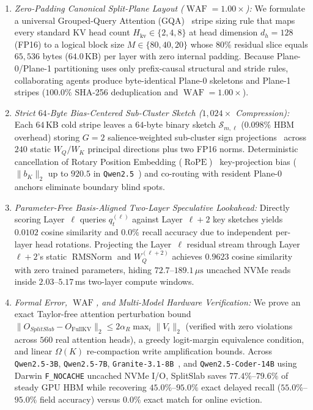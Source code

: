 \documentclass[10pt,journal,compsoc]{IEEEtran}
\theoremstyle{definition}
\theoremstyle{remark}
\newcommand{\SplitSlab}{\textup{\textsc{SplitSlab}}}
\newcommand{\RMSNorm}{\operatorname{RMSNorm}}
\newcommand{\RoPE}{\operatorname{RoPE}}
\newcommand{\WAF}{\operatorname{WAF}}
\def\SplitSlab{SplitSlab}%
\begin{document}
\begin{enumerate}
  \item \emph{Zero-Padding Canonical Split-Plane Layout ($\WAF = 1.00\times$):} We formulate a universal Grouped-Query Attention (GQA)~\cite{ainslie2023gqa} stripe sizing rule that maps every standard KV head count $H_{\mathrm{kv}} \in \{2, 4, 8\}$ at head dimension $d_h = 128$ (FP16) to a logical block size $M \in \{80, 40, 20\}$ whose $80\%$ residual slice equals $65{,}536$ bytes ($64.0$\,KB) per layer with zero internal padding. Because Plane-0/Plane-1 partitioning uses only prefix-causal structural and stride rules, collaborating agents produce byte-identical Plane-0 skeletons and Plane-1 stripes ($100.0\%$ SHA-256 deduplication and $\WAF = 1.00\times$).
  \item \emph{Strict $64$-Byte Bias-Centered Sub-Cluster Sketch ($1{,}024\times$ Compression):} Each $64$\,KB cold stripe leaves a $64$-byte binary sketch $\mathcal{S}_{m,\ell}$ ($0.098\%$ HBM overhead) storing $G=2$ salience-weighted sub-cluster sign projections~\cite{charikar2002simhash,gao2024rabitq} across $240$ static $W_Q/W_K$ principal directions plus two FP16 norms. Deterministic cancellation of Rotary Position Embedding ($\RoPE$)~\cite{su2024roformer} key-projection bias ($\|b_K\|_2$ up to $920.5$ in \texttt{Qwen2.5}~\cite{yang2024qwen25}) and co-routing with resident Plane-0 anchors eliminate boundary blind spots.
  \item \emph{Parameter-Free Basis-Aligned Two-Layer Speculative Lookahead:} Directly scoring Layer~$\ell$ queries $q_t^{(\ell)}$ against Layer~$\ell+2$ key sketches yields $0.0102$ cosine similarity and $0.0\%$ recall accuracy due to independent per-layer head rotations. Projecting the Layer~$\ell$ residual stream through Layer~$\ell+2$'s static $\RMSNorm$ and $W_Q^{(\ell+2)}$ achieves $0.9623$ cosine similarity with zero trained parameters, hiding $72.7$--$189.1\,\mu\mathrm{s}$ uncached NVMe reads inside $2.03$--$5.17$\,ms two-layer compute windows.
  \item \emph{Formal Error, $\WAF$, and Multi-Model Hardware Verification:} We prove an exact Taylor-free attention perturbation bound $\|O_{\SplitSlab} - O_{\mathrm{FullKV}}\|_2 \le 2\alpha_R \max_i\|V_i\|_2$ (verified with zero violations across $560$ real attention heads), a greedy logit-margin equivalence condition, and linear $\Omega(K)$ re-compaction write amplification bounds. Across \texttt{Qwen2.5-3B}, \texttt{Qwen2.5-7B}, \texttt{Granite-3.1-8B}~\cite{mishra2024granite}, and \texttt{Qwen2.5-Coder-14B} using Darwin \texttt{F\_NOCACHE} uncached NVMe I/O, \SplitSlab{} saves $77.4\%$--$79.6\%$ of steady GPU HBM while recovering $45.0\%$--$95.0\%$ exact delayed recall ($55.0\%$--$95.0\%$ field accuracy) versus $0.0\%$ exact match for online eviction.
\end{enumerate}
\end{document}

